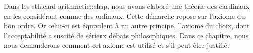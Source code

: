 \documentclass[../../../include/open-logic-section]{subfiles}
\begin{document}


Dans les 
{sth:card-arithmetic::chap}, nous avons élaboré
une théorie des cardinaux en les considérant
comme des ordinaux. Cette démarche repose
sur l'axiome du bon ordre. Or celui-ci
est équivalent à un autre principe,
l'axiome du choix, dont l'acceptabilité
a suscité de sérieux débats philosophiques.
Dans ce chapitre, nous nous demanderons
comment cet axiome est utilisé et s'il
peut être justifié.
\end{document}
